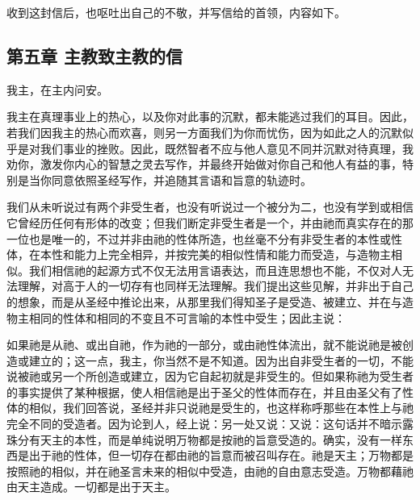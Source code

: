 收到这封信后，也呕吐出自己的不敬，并写信给的首领，内容如下。\par


\subsection{第五章 主教致主教的信}

我主，在主内问安。\par

我主在真理事业上的热心，以及你对此事的沉默，都未能逃过我们的耳目。因此，若我们因我主的热心而欢喜，则另一方面我们为你而忧伤，因为如此之人的沉默似乎是对我们事业的挫败。因此，既然智者不应与他人意见不同并沉默对待真理，我劝你，激发你内心的智慧之灵去写作，并最终开始做对你自己和他人有益的事，特别是当你同意依照圣经写作，并追随其言语和旨意的轨迹时。\par

我们从未听说过有两个非受生者，也没有听说过一个被分为二，也没有学到或相信它曾经历任何有形体的改变；但我们断定非受生者是一个，并由祂而真实存在的那一位也是唯一的，不过并非由祂的性体所造，也丝毫不分有非受生者的本性或性体，在本性和能力上完全相异，并按完美的相似性情和能力而受造，与造物主相似。我们相信祂的起源方式不仅无法用言语表达，而且连思想也不能，不仅对人无法理解，对高于人的一切存有也同样无法理解。我们提出这些见解，并非出于自己的想象，而是从圣经中推论出来，从那里我们得知圣子是受造、被建立、并在与造物主相同的性体和相同的不变且不可言喻的本性中受生；因此主说：\par

如果祂是从祂、或出自祂，作为祂的一部分，或由祂性体流出，就不能说祂是被创造或建立的；这一点，我主，你当然不是不知道。因为出自非受生者的一切，不能说被祂或另一个所创造或建立，因为它自起初就是非受生的。但如果称祂为受生者的事实提供了某种根据，使人相信祂是出于圣父的性体而存在，并且由圣父有了性体的相似，我们回答说，圣经并非只说祂是受生的，也这样称呼那些在本性上与祂完全不同的受造者。因为论到人，经上说：另一处又说：又说：这句话并不暗示露珠分有天主的本性，而是单纯说明万物都是按祂的旨意受造的。确实，没有一样东西是出于祂的性体，但一切存在都由祂的旨意而被召叫存在。祂是天主；万物都是按照祂的相似，并在祂圣言未来的相似中受造，由祂的自由意志受造。万物都藉祂由天主造成。一切都是出于天主。\par

